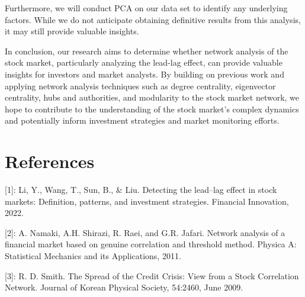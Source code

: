 \documentclass{article}
\begin{document}
Furthermore, we will conduct PCA on our data set to identify any underlying factors. While we do not anticipate obtaining definitive results from this analysis, it may still provide valuable insights.

In conclusion, our research aims to determine whether network analysis of the stock market, particularly analyzing the lead-lag effect, can provide valuable insights for investors and market analysts. By building on previous work and applying network analysis techniques such as degree centrality, eigenvector centrality, hubs and authorities, and modularity to the stock market network, we hope to contribute to the understanding of the stock market's complex dynamics and potentially inform investment strategies and market monitoring efforts.



\section*{References}

[1]: Li, Y., Wang, T., Sun, B., \& Liu. Detecting the lead–lag effect in stock markets: Definition, patterns, and investment strategies. Financial Innovation, 2022.

[2]: A. Namaki, A.H. Shirazi, R. Raei, and G.R. Jafari. Network analysis of a financial market based on genuine correlation and threshold method. Physica A: Statistical
Mechanics and its Applications, 2011.

[3]: R. D. Smith. The Spread of the Credit Crisis: View
from a Stock Correlation Network. Journal of Korean
Physical Society, 54:2460, June 2009.

\medskip



\small

\end{document}
